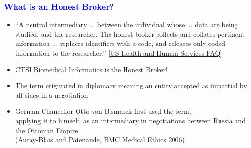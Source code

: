 \documentclass[11pt,pdftex,dvipsnames,usenames]{beamer}
\begin{document}
\begin{comment}
\begin{frame}[fragile]\frametitle{\bf\textcolor{blue}{What is an Electronic Health Record?}}

\begin{itemize}
\item Electronic Medical Record (EMR) and\\ 
Electronic Health Record (EHR)\\
are often used interchangeably
\item However, there is a subtle distinction
\item Technically, the EMR is merely a digital version (whether of
  digital provenance or scanned images) of what used to be a paper
  {\it medical record} (a misnomer anyway since NOT limited to
  merely medicine)
\item Typically, the EMR is a collection of health-related data
\item Doctor/nursing/etc.\ notes: not available in the CRDW
\item Imaging, laboratory results, vital signs, etc. 
\item Whereas the EHR is an information management system like EPIC
  providing convenient access to the EMR along with other ancillary
  digital capabilities such as \textcolor{red}{billing}/scheduling,
  prescription pharmaceutical orders and modern data sources 
including X-ray/CAT/MRI scans,  chemo-/radio-therapy dosage,
  electrocardiograms, echocardiograms, etc.
\end{itemize}

\end{frame}
\end{comment}

\begin{frame}[fragile]\frametitle{\bf\textcolor{blue}{What is an Honest Broker?}}

\begin{itemize}
\item
``A neutral intermediary ... between the individual whose ... data are being studied, and the researcher. The honest broker collects and collates pertinent information ... replaces identifiers with a code, and releases only coded information to the researcher.''
 \textcolor{PineGreen}{[\href{https://www.hhs.gov/ohrp/sachrp-committee/recommendations/2011-october-13-letter-attachment-d/index.html}{US
     Health and Human Services FAQ}]}
\item CTSI Biomedical Informatics is the Honest Broker!
\item The term originated in diplomacy meaning an entity
accepted as impartial by all sides in a negotiation
\item German Chancellor Otto von Bismarck first used the term,\\
  applying it to himself, as an intermediary in negotiations
  between Russia and the Ottoman Empire\\ (Auray-Blais and Patenaude,
  BMC Medical Ethics 2006)
\end{itemize}

\end{frame}
\end{document}
